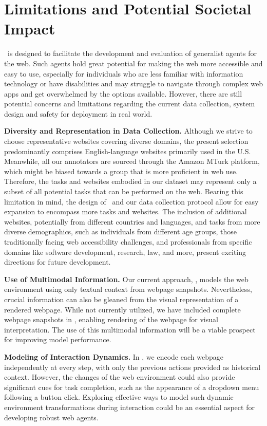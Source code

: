 \section{Limitations and Potential Societal Impact}
\label{app:limitation}
\mind\ is designed to facilitate the development and evaluation of generalist agents for the web. Such agents hold great potential for making the web more accessible and easy to use, especially for individuals who are less familiar with information technology or have disabilities and may struggle to navigate through complex web apps and get overwhelmed by the options available.
However, there are still potential concerns and limitations regarding the current data collection, system design and safety for deployment in real world.

\noindent\textbf{Diversity and Representation in Data Collection.}
Although we strive to choose representative websites covering diverse domains, the present selection predominantly comprises English-language websites primarily used in the U.S.
Meanwhile, all our annotators are sourced through the Amazon MTurk platform, which might be biased towards a group that is more proficient in web use. 
Therefore, the tasks and websites embodied in our dataset may represent only a subset of all potential tasks that can be performed on the web.
Bearing this limitation in mind, the design of \mind\ and our data collection protocol allow for easy expansion to encompass more tasks and websites.
The inclusion of additional websites, potentially from different countries and languages, and tasks from more diverse demographics, such as individuals from different age groups, those traditionally facing web accessibility challenges, and professionals from specific domains like software development, research, law, and more, present exciting directions for future development.

\noindent\textbf{Use of Multimodal Information.}
Our current approach, \model, models the web environment using only textual context from webpage snapshots. Nevertheless, crucial information can also be gleaned from the visual representation of a rendered webpage.
While not currently utilized, we have included complete webpage snapshots in \mind, enabling rendering of the webpage for visual interpretation. The use of this multimodal information will be a viable prospect for improving model performance.

\noindent\textbf{Modeling of Interaction Dynamics.}
In \model, we encode each webpage independently at every step, with only the previous actions provided as historical context.
However, the changes of the web environment could also provide significant cues for task completion, such as the appearance of a dropdown menu following a button click.
Exploring effective ways to model such dynamic environment transformations during interaction could be an essential aspect for developing robust web agents.

